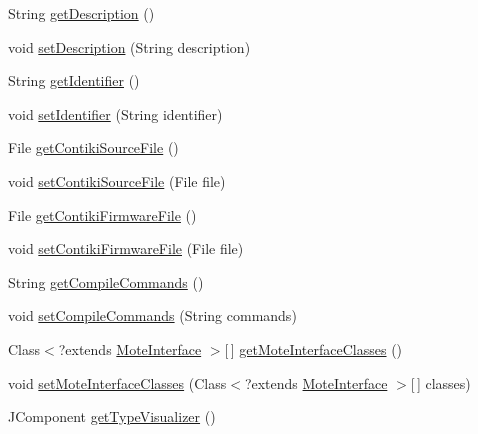 \begin{DoxyCompactItemize}
\item 
String \hyperlink{interfaceorg_1_1contikios_1_1cooja_1_1MoteType_ad1882a7f2f3601919bb652528366fab0}{get\-Description} ()
\item 
void \hyperlink{interfaceorg_1_1contikios_1_1cooja_1_1MoteType_a92c342553b5fd0115dd0bb9d981f7817}{set\-Description} (String description)
\item 
String \hyperlink{interfaceorg_1_1contikios_1_1cooja_1_1MoteType_aa5c2986ffddcf15220a81cfcd6384957}{get\-Identifier} ()
\item 
void \hyperlink{interfaceorg_1_1contikios_1_1cooja_1_1MoteType_aee2769cce57b65416f5b0bda8da6c781}{set\-Identifier} (String identifier)
\item 
File \hyperlink{interfaceorg_1_1contikios_1_1cooja_1_1MoteType_a627bec8f129aa3d29dacc36adccc2f1d}{get\-Contiki\-Source\-File} ()
\item 
void \hyperlink{interfaceorg_1_1contikios_1_1cooja_1_1MoteType_a1336b4ddfdc6b7d0a3abad3ed5a0fbec}{set\-Contiki\-Source\-File} (File file)
\item 
File \hyperlink{interfaceorg_1_1contikios_1_1cooja_1_1MoteType_a7e89540390017160481dd301c767a910}{get\-Contiki\-Firmware\-File} ()
\item 
void \hyperlink{interfaceorg_1_1contikios_1_1cooja_1_1MoteType_a3ffbf1a84ca7faa90b1e397797006c15}{set\-Contiki\-Firmware\-File} (File file)
\item 
String \hyperlink{interfaceorg_1_1contikios_1_1cooja_1_1MoteType_ac47a5eea1447f155c3c44b940e30e0e3}{get\-Compile\-Commands} ()
\item 
void \hyperlink{interfaceorg_1_1contikios_1_1cooja_1_1MoteType_aca90f15a66d2563f8b85368f8e8141f5}{set\-Compile\-Commands} (String commands)
\item 
Class$<$?extends \hyperlink{classorg_1_1contikios_1_1cooja_1_1MoteInterface}{Mote\-Interface} $>$\mbox{[}$\,$\mbox{]} \hyperlink{interfaceorg_1_1contikios_1_1cooja_1_1MoteType_a2b78640d9f2bfcc67b9dd1947e7b267c}{get\-Mote\-Interface\-Classes} ()
\item 
void \hyperlink{interfaceorg_1_1contikios_1_1cooja_1_1MoteType_a56005afd3b0e73bccd098f51f209b411}{set\-Mote\-Interface\-Classes} (Class$<$?extends \hyperlink{classorg_1_1contikios_1_1cooja_1_1MoteInterface}{Mote\-Interface} $>$\mbox{[}$\,$\mbox{]} classes)
\item 
J\-Component \hyperlink{interfaceorg_1_1contikios_1_1cooja_1_1MoteType_aa61c6ade090027a69bf38d84f6194db4}{get\-Type\-Visualizer} ()

\end{DoxyCompactItemize}
